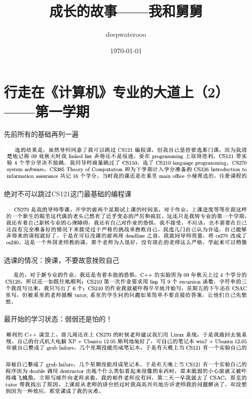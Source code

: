 \documentclass[9pt, b5paper]{article}
\author{deepwaterooo}
\date{\today}
\title{成长的故事——我和舅舅}
\begin{document}
\maketitle
\tableofcontents


\section{行走在《计算机》专业的大道上（2）——第一学期}
\label{sec:org8910421}

先前所有的基础再列一遍

\begin{center}
\includegraphics[width=.9\linewidth]{./pic/backups_plans_20210424_203000.png}
\end{center}

绝对不可以跳过CS121这门最基础的编程课

\begin{center}
\includegraphics[width=.9\linewidth]{./pic/backups_plans_20210424_203059.png}
\end{center}

选课的情况：换课，不要故意挫败自己


\begin{center}
\includegraphics[width=.9\linewidth]{./pic/backups_plans_20210424_203308.png}
\end{center}

最开始的学习状态：弱弱还是怕的！

\begin{center}
\includegraphics[width=.9\linewidth]{./pic/backups_plans_20210424_203440.png}
\end{center}

\begin{center}
\includegraphics[width=.9\linewidth]{./pic/backups_plans_20210424_203454.png}
\end{center}
\end{document}
